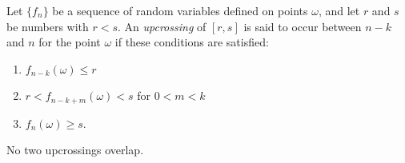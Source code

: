 Let $\{f_n\}$ be a sequence of random variables defined on points $\omega$, and let $r$ and $s$ be numbers with $r < s$. An \emph{upcrossing} of $[r, s]$ is said to occur between $n - k$ and $n$ for the point $\omega$ if these conditions are satisfied:
\begin{enumerate}
  \item $f_{n-k}(\omega) \leq r$
  \item $r < f_{n-k+m}(\omega) < s$ for $0 < m < k$
  \item $f_n(\omega) \geq s$.
\end{enumerate}
No two upcrossings overlap.
